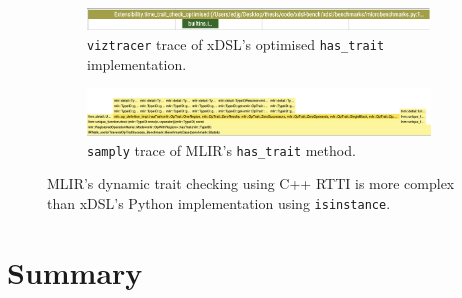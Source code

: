 \begin{figure}[H]
    \centering
    \begin{subfigure}[b]{\textwidth}
        \includegraphics[width=\textwidth]{images/impact_dynamism/hastrait_xdsl_viztracer_optimised.png}
        \caption{\texttt{viztracer} trace of xDSL's optimised \texttt{has_trait} implementation.}
        \label{fig:ubenchmark-hastrait-xdsl-viztracer-optimised}
    \end{subfigure}
    \begin{subfigure}[b]{\textwidth}
        \includegraphics[width=\textwidth]{images/impact_dynamism/hastrait_mlir_samply.png}
        \caption{\texttt{samply} trace of MLIR's \texttt{has_trait} method.}
        \label{fig:ubenchmark-hastrait-mlir-samply}
    \end{subfigure}
    \caption{MLIR's dynamic trait checking using C++ RTTI is more complex than xDSL's Python implementation using \texttt{isinstance}.}
    \label{fig:ubenchmark-hastrait-dynamism}
\end{figure}







\section{Summary}


